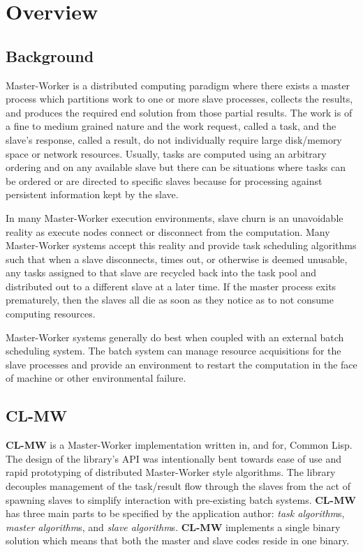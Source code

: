 \documentclass[titlepage,12pt]{book}
\newcommand{\xsmall}{\latexhtml{\small}{}}
\newcommand{\xnormalsize}{\latexhtml{\normalsize}{}}
\newcommand{\mw}{Master-Worker\xspace}
\newcommand{\clmw}{\xsmall\textbf{CL-MW}\xnormalsize\xspace}
\newcommand{\sas}{\textit{slave algorithm}s\xspace}
\newcommand{\mas}{\textit{master algorithm}s\xspace}
\newcommand{\tas}{\textit{task algorithm}s\xspace}
\begin{document}
\mainmatter

\chapter{Overview}

\section{Background}
\mw is a distributed computing paradigm where there exists a
master process which partitions work to one or more slave processes,
collects the results, and produces the required end solution from
those partial results.  The work is of a fine to medium grained
nature and the work request, called a task, and the slave's response,
called a result, do not individually require large disk/memory space
or network resources. Usually, tasks are computed using an arbitrary
ordering and on any available slave but there can be situations where
tasks can be ordered or are directed to specific slaves because for
processing against persistent information kept by the slave.

In many \mw execution environments, slave churn is an unavoidable
reality as execute nodes connect or disconnect from the computation.
Many \mw systems accept this reality and provide task scheduling
algorithms such that when a slave disconnects, times out, or otherwise
is deemed unusable, any tasks assigned to that slave are recycled
back into the task pool and distributed out to a different slave at a
later time. If the master process exits prematurely, then the slaves
all die as soon as they notice as to not consume computing resources.

\mw systems generally do best when coupled with an external batch
scheduling system. The batch system can manage resource acquisitions
for the slave processes and provide an environment to restart the
computation in the face of machine or other environmental failure.

\section{\clmw}
\clmw is a \mw implementation written in, and for, Common Lisp. The
design of the library's API was intentionally bent towards ease of
use and rapid prototyping of distributed \mw style algorithms.
The library decouples management of the task/result flow through
the slaves from the act of spawning slaves to simplify interaction
with pre-existing batch systems. \clmw has three main parts to be
specified by the application author: \tas, \mas, and \sas. \clmw
implements a single binary solution which means that both the master
and slave codes reside in one binary.
\end{document}
